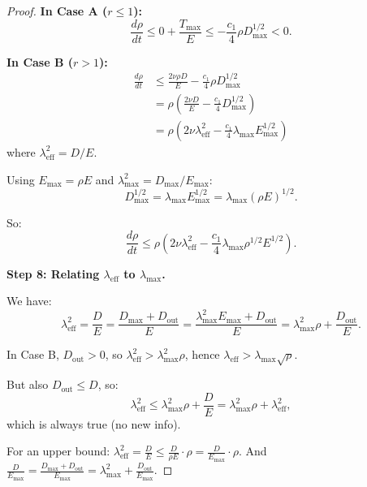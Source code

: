 \documentclass[11pt]{article}
\theoremstyle{definition}
\begin{document}
\begin{proof}
\textbf{In Case A ($r \leq 1$):}
\begin{equation}
\frac{d\rho}{dt} \leq 0 + \frac{T_{\max}}{E} \leq -\frac{c_1}{4} \rho D_{\max}^{1/2} < 0.
\end{equation}

\textbf{In Case B ($r > 1$):}
\begin{align}
\frac{d\rho}{dt} &\leq \frac{2\nu \rho D}{E} - \frac{c_1}{4} \rho D_{\max}^{1/2} \\
&= \rho \left( \frac{2\nu D}{E} - \frac{c_1}{4} D_{\max}^{1/2} \right) \\
&= \rho \left( 2\nu \lambda_{\text{eff}}^2 - \frac{c_1}{4} \lambda_{\max} E_{\max}^{1/2} \right)
\end{align}
where $\lambda_{\text{eff}}^2 = D/E$.

Using $E_{\max} = \rho E$ and $\lambda_{\max}^2 = D_{\max}/E_{\max}$:
\begin{equation}
D_{\max}^{1/2} = \lambda_{\max} E_{\max}^{1/2} = \lambda_{\max} (\rho E)^{1/2}.
\end{equation}

So:
\begin{equation}
\frac{d\rho}{dt} \leq \rho \left( 2\nu \lambda_{\text{eff}}^2 - \frac{c_1}{4} \lambda_{\max} \rho^{1/2} E^{1/2} \right).
\end{equation}

\textbf{Step 8: Relating $\lambda_{\text{eff}}$ to $\lambda_{\max}$.}

We have:
\begin{equation}
\lambda_{\text{eff}}^2 = \frac{D}{E} = \frac{D_{\max} + D_{\text{out}}}{E} = \frac{\lambda_{\max}^2 E_{\max} + D_{\text{out}}}{E} = \lambda_{\max}^2 \rho + \frac{D_{\text{out}}}{E}.
\end{equation}

In Case B, $D_{\text{out}} > 0$, so $\lambda_{\text{eff}}^2 > \lambda_{\max}^2 \rho$, hence $\lambda_{\text{eff}} > \lambda_{\max} \sqrt{\rho}$.

But also $D_{\text{out}} \leq D$, so:
\begin{equation}
\lambda_{\text{eff}}^2 \leq \lambda_{\max}^2 \rho + \frac{D}{E} = \lambda_{\max}^2 \rho + \lambda_{\text{eff}}^2,
\end{equation}
which is always true (no new info).

For an upper bound: $\lambda_{\text{eff}}^2 = \frac{D}{E} \leq \frac{D}{\rho E} \cdot \rho = \frac{D}{E_{\max}} \cdot \rho$. And $\frac{D}{E_{\max}} = \frac{D_{\max} + D_{\text{out}}}{E_{\max}} = \lambda_{\max}^2 + \frac{D_{\text{out}}}{E_{\max}}$.


\end{proof}
\end{document}
